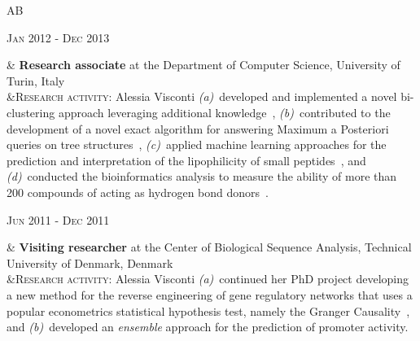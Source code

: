 \documentclass[a4paper,10pt]{article}
\newenvironment{doubletablelist}
{
	\vspace{-0.2cm}
	\begin{longtable}[!h]{AB}}{\end{longtable}
}
\newcommand{\dtlist}[2]{
\hspace{-3cm}
\noindent
	\begin{minipage}{0.22\textwidth}
	\begin{flushright}
	\textsc{#1}
	\end{flushright}
	\end{minipage}
	& #2\\[0.2cm]
}
\begin{document}
\begin{doubletablelist}
	\dtlist{Jan 2012 - Dec 2013}{\textbf{Research associate} at the Department of Computer Science, University of Turin, Italy \\ %
	 &\textsc{Research activity}: Alessia Visconti \emph{(a)}~developed and implemented a novel bi-clustering approach leveraging additional knowledge~\cite{Vis13a}, \emph{(b)}~contributed to the development of a novel exact algorithm for answering Maximum a Posteriori queries on tree structures~\cite{Esp13}, \emph{(c)}~applied machine learning approaches for the prediction and interpretation of the lipophilicity of small peptides~\cite{Vis15a}, and \emph{(d)}~conducted the bioinformatics analysis to measure the ability of more than 200 compounds of acting as hydrogen bond donors~\cite{Erm14}.%
	}
	\dtlist{Jun 2011 - Dec 2011}{\textbf{Visiting researcher} at the Center of Biological Sequence Analysis, Technical University of Denmark, Denmark 
	\\ %
		  &\textsc{Research activity}: Alessia Visconti \emph{(a)}~continued her PhD project developing a new method for the reverse engineering of gene regulatory networks that uses a popular econometrics statistical hypothesis test, namely the Granger Causality~\cite{Vis12b}, and \emph{(b)}~developed an \emph{ensemble} approach for the prediction of promoter activity. %
	}


\end{doubletablelist}
\end{document}
